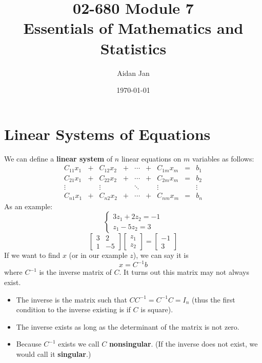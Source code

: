 \documentclass[10pt]{article}
\title{02-680 Module 7 \\ \large{Essentials of Mathematics and Statistics}}
\author{Aidan Jan}
\date{\today}
\begin{document}
\maketitle

\section*{Linear Systems of Equations}
We can define a \textbf{linear system} of $n$ linear equations on $m$ variables as follows:
\[\begin{matrix}
C_{11} x_1 &+& C_{12} x_2 &+& \cdots &+& C_{1m}x_m &=& b_1 \\
C_{21} x_1 &+& C_{22} x_2 &+& \cdots &+& C_{2m}x_m &=& b_2 \\
\vdots & & \vdots & & \ddots & & \vdots & & \vdots \\
C_{n1} x_1 &+& C_{n2} x_2 &+& \cdots &+& C_{nm}x_m &=& b_n
\end{matrix}\]
As an example:
\[\begin{cases} 3z_1 + 2z_2 = -1 \\ z_1 - 5z_2 = 3 \end{cases}\]
\[\begin{bmatrix} 3 & 2 \\ 1 & -5 \end{bmatrix} \begin{bmatrix} z_1 \\ z_2 \end{bmatrix} = \begin{bmatrix} -1 \\ 3 \end{bmatrix}\]
If we want to find $x$ (or in our example $z$), we can say it is
\[x = C^{-1}b\]
where $C^{-1}$ is the inverse matrix of $C$.  It turns out this matrix may not always exist.
\begin{itemize}
	\item The inverse is the matrix such that $CC^{-1} = C^{-1}C = I_n$ (thus the first condition to the inverse existing is if $C$ is square).
	\item The inverse exists as long as the determinant of the matrix is not zero.
	\item Because $C^{-1}$ exists we call $C$ \textbf{nonsingular}.  (If the inverse does not exist, we would call it \textbf{singular}.)
\end{itemize}
\end{document}
